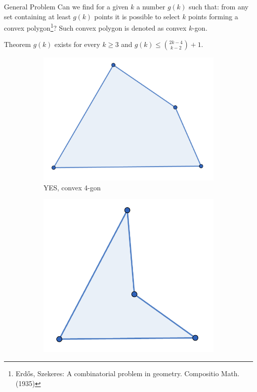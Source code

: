 \documentclass{beamer}
\begin{document}
\begin{frame}{General Problem}
	Can we find for a given $k$ a number $g(k)$ such that: from any set containing at least $g(k)$ points it is possible to select $k$ points forming a convex polygon\footnote{Erd\H{o}s, Szekeres: A combinatorial problem in geometry. Compositio Math. (1935)}? Such convex polygon is denoted as convex $k$-gon.

	\begin{block}{Theorem}
		$g(k)$ exists for every $k \ge 3$ and $g(k) \le \binom{2k-4}{k-2} + 1$.
	\end{block}

	 {

		\begin{figure}
			\centering
			\begin{subfigure}[t]{0.3\textwidth}
				\includegraphics[width=\textwidth]{4gon.png}
				\caption{YES, convex 4-gon}
				\label{fig4gon}
			\end{subfigure}
			\begin{subfigure}[t]{0.3\textwidth}
				\includegraphics[width=\textwidth]{not_4gon.png}

\end{subfigure}
\end{figure}}
\end{frame}
\end{document}

